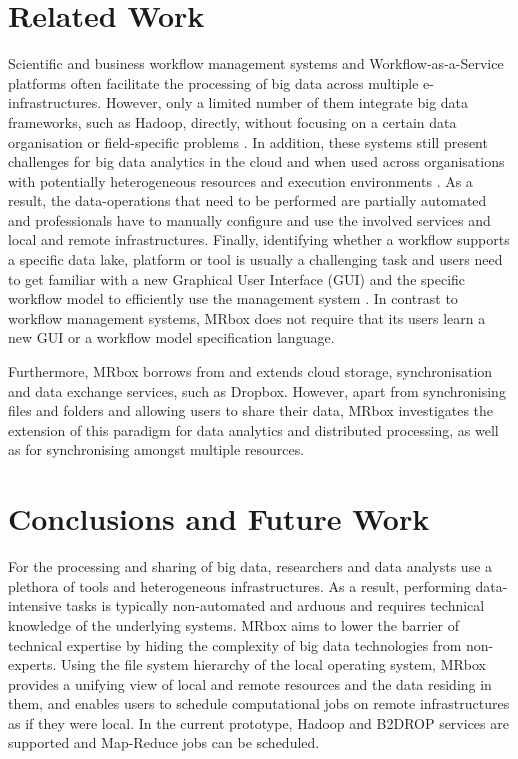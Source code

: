 \section{Related Work}
Scientific and business workflow management systems and Workflow-as-a-Service platforms \cite[etc.]{kepler,pegasus,dare} often facilitate the processing of big data across multiple e-infrastructures. However, only a limited number of them integrate big data frameworks, such as Hadoop, directly, without focusing on a certain data organisation or field-specific problems \cite{wang2009kepler}. In addition, these systems still present challenges for big data analytics in the cloud and when used across organisations with potentially heterogeneous resources and execution environments \cite{khan2019big}. As a result, the data-operations that need to be performed are partially automated and professionals have to manually configure and use the involved services and local and remote infrastructures. Finally, identifying whether a workflow supports a specific data lake, platform or tool is usually a challenging task and users need to get familiar with a new Graphical User Interface (GUI) and the specific workflow model to efficiently use the management system \cite{khan2019big, wang2009kepler}. In contrast to workflow management systems, MRbox does not require that its users learn a new GUI or a workflow model specification language.

Furthermore, MRbox borrows from and extends cloud storage, synchronisation and data exchange services, such as Dropbox. However, apart from synchronising files and folders and allowing users to share their data, MRbox investigates the extension of this paradigm for data analytics and distributed processing, as well as for synchronising amongst multiple resources.

\section{Conclusions and Future Work}
For the processing and sharing of big data, researchers and data analysts use a plethora of tools and heterogeneous infrastructures. As a result, performing data-intensive tasks is typically non-automated and arduous and requires technical knowledge of the underlying systems. MRbox aims to lower the barrier of technical expertise by hiding the complexity of big data technologies from non-experts. Using the file system hierarchy of the local operating system, MRbox provides a unifying view of local and remote resources and the data residing in them, and enables users to schedule computational jobs on remote infrastructures as if they were local. In the current prototype, Hadoop and B2DROP services are supported and Map-Reduce jobs can be scheduled.

